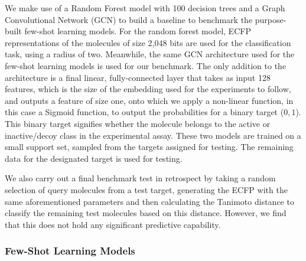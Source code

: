 We make use of a Random Forest model with 100 decision trees and a Graph Convolutional Network (GCN) to build a baseline to benchmark the purpose-built few-shot learning models. For the random forest model, ECFP representations of the molecules of size 2,048 bits are used for the classification task, using a radius of two. Meanwhile, the same GCN architecture used for the few-shot learning models is used for our benchmark. The only addition to the architecture is a final linear, fully-connected layer that takes as input 128 features, which is the size of the embedding used for the experiments to follow, and outputs a feature of size one, onto which we apply a non-linear function, in this case a Sigmoid function, to output the probabilities for a binary target (${0, 1}$). This binary target signifies whether the molecule belongs to the active or inactive/decoy class in the experimental assay. These two models are trained on a small support set, sampled from the targets assigned for testing. The remaining data for the designated target is used for testing.

We also carry out a final benchmark test in retrospect by taking a random selection of query molecules from a test target, generating the ECFP with the same aforementioned parameters and then calculating the Tanimoto distance to classify the remaining test molecules based on this distance. However, we find that this does not hold any significant predictive capability. 

\subsubsection{Few-Shot Learning Models}

